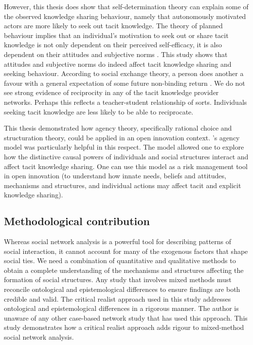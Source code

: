 However, this thesis does show that self-determination theory can explain some of the observed knowledge sharing behaviour, namely that autonomously motivated actors are more likely to seek out tacit knowledge. The theory of planned behaviour implies that an individual's motivation to seek out or share tacit knowledge is not only dependent on their perceived self-efficacy, it is also dependent on their attitudes and subjective norms \citep{gagne2009model}. This study shows that attitudes and subjective norms do indeed affect tacit knowledge sharing and seeking behaviour. According to social exchange theory, a person does another a favour with a general expectation of some future non-binding return \citep{homans1961social}. We do not see strong evidence of reciprocity in any of the tacit knowledge provider networks. Perhaps this reflects a teacher-student relationship of sorts. Individuals seeking tacit knowledge are less likely to be able to reciprocate. \medskip

This thesis demonstrated how agency theory, specifically rational choice and structuration theory, could be applied in an open innovation context. \citeauthor{loyal2001agency}'s \citeyearpar{loyal2001agency} agency model was particularly helpful in this respect. The model allowed one to explore how the distinctive causal powers of individuals and social structures interact and affect tacit knowledge sharing. One can use this model as a risk management tool in open innovation (to understand how innate needs, beliefs and attitudes, mechanisms and structures, and individual actions may affect tacit and explicit knowledge sharing). 

\subsection{Methodological contribution}

Whereas social network analysis is a powerful tool for describing patterns of social interaction, it cannot account for many of the exogenous factors that shape social ties. We need a combination of quantitative and qualitative methods to obtain a complete understanding of the mechanisms and structures affecting the formation of social structures. Any study that involves mixed methods must reconcile ontological and epistemological differences to ensure findings are both credible and valid. The critical realist approach used in this study addresses ontological and epistemological differences in a rigorous manner. The author is unaware of any other case-based network study that has used this approach. This study demonstrates how a critical realist approach adds rigour to mixed-method social network analysis.

